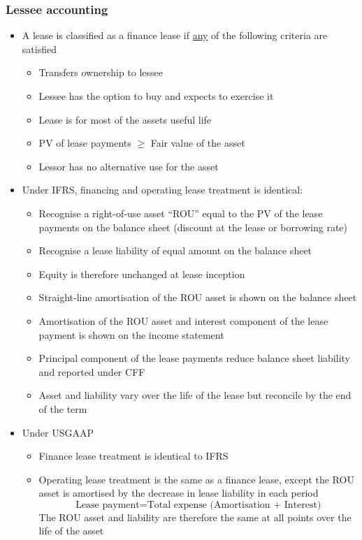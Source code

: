 \documentclass[../notes_compiled.tex]{subfiles}
\begin{document}
\subsubsection{Lessee accounting}
\begin{itemize}
\item A lease is classified as a finance lease if \underline{any} of the following criteria are satisfied
\begin{itemize}
\item Transfers ownership to lessee
\item Lessee has the option to buy and expects to exercise it
\item Lease is for most of the assets useful life
\item PV of lease payments $\geq$ Fair value of the asset
\item Lessor has no alternative use for the asset
\end{itemize}

\item Under IFRS, financing and operating lease treatment is identical:
\begin{itemize}
\item Recognise a right-of-use asset ``ROU'' equal to the PV of the lease payments on the balance sheet (discount at the lease or borrowing rate)
\item Recognise a lease liability of equal amount on the balance sheet
\item Equity is therefore unchanged at lease inception
\item Straight-line amortisation of the ROU asset is shown on the balance sheet
\item Amortisation of the ROU asset and interest component of the lease payment is shown on the income statement
\item Principal component of the lease payments reduce balance sheet liability and reported under CFF
\item Asset and liability vary over the life of the lease but reconcile by the end of the term
\end{itemize}

\item Under USGAAP
\begin{itemize}
\item Finance lease treatment is identical to IFRS
\item Operating lease treatment is the same as a finance lease, except the ROU asset is amortised by the decrease in lease liability in each period
\begin{equation}
\text{Lease payment} = \text{Total expense (Amortisation + Interest)}
\end{equation}
The ROU asset and liability are therefore the same at all points over the life of the asset
\end{itemize}


\end{itemize}
\end{document}
